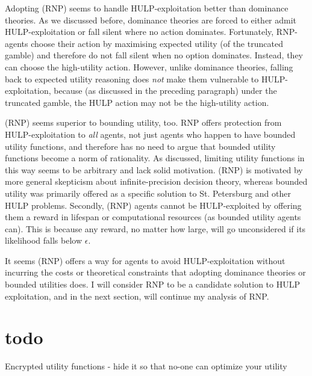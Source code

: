 \documentclass{article}
\begin{document}
Adopting (RNP) seems to handle HULP-exploitation better than dominance theories. As we discussed before, dominance theories are forced to either admit HULP-exploitation or fall silent where no action dominates. Fortunately, RNP-agents choose their action by maximising expected utility (of the truncated gamble) and therefore do not fall silent when no option dominates. Instead, they can choose the high-utility action. However, unlike dominance theories, falling back to expected utility reasoning does \textit{not} make them vulnerable to HULP-exploitation, because (as discussed in the preceding paragraph) under the truncated gamble, the HULP action may not be the high-utility action. 

(RNP) seems superior to bounding utility, too. RNP offers protection from HULP-exploitation to \textit{all} agents, not just agents who happen to have bounded utility functions, and therefore has no need to argue that bounded utility functions become a norm of rationality. As discussed, limiting utility functions in this way seems to be arbitrary and lack solid motivation. (RNP) is motivated by more general skepticism about infinite-precision decision theory, whereas bounded utility was primarily offered as a specific solution to St. Petersburg and other HULP problems. Secondly, (RNP) agents cannot be HULP-exploited by offering them a reward in lifespan or computational resources (as bounded utility agents can). This is because any reward, no matter how large, will go unconsidered if its likelihood falls below \(\epsilon\).

It seems (RNP) offers a way for agents to avoid HULP-exploitation without incurring the costs or theoretical constraints that adopting dominance theories or bounded utilities does. I will consider RNP to be a candidate solution to HULP exploitation, and in the next section, will continue my analysis of RNP.

\section{todo}
Encrypted utility functions - hide it so that no-one can optimize your utility



\end{document}
